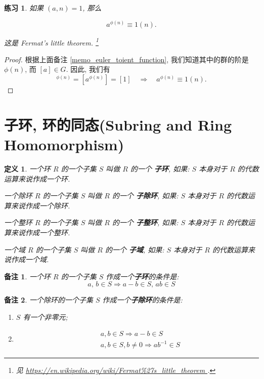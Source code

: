 \documentclass[utf8]{ctexbook}
\newtheorem{definition}{定义}[section]
\newtheorem{memo}{备注}[section]
\newtheorem{exercise}{练习}[section]
\begin{document}
\begin{exercise}
如果 $(a,n)=1$, 那么

\begin{equation}
a^{\phi(n)} \equiv 1 (n) .
\end{equation}

这是 Fermat's little theorem. \footnote{见 \url{https://en.wikipedia.org/wiki/Fermat\%27s\_little\_theorem }.}
\end{exercise}

\begin{proof}
根据上面备注 \ref{memo_euler_toient_function}, 我们知道其中的群的阶是 $\phi(n)$, 而 $[a] \in G$. 因此, 我们有
\begin{equation}
[a]^{\phi(n)} = [a ^{\phi(n)}] = [1] \quad \Rightarrow \quad a^{\phi(n)} \equiv 1(n) .
\end{equation}



\end{proof}


\section{子环, 环的同态(Subring and Ring Homomorphism)}

\begin{definition}
一个环 $R$ 的一个子集 $S$ 叫做 $R$ 的一个 \textbf{子环}, 如果: $S$ 本身对于 $R$ 的代数运算来说作成一个环.

一个除环 $R$ 的一个子集 $S$ 叫做 $R$ 的一个 \textbf{子除环}, 如果: $S$ 本身对于 $R$ 的代数运算来说作成一个除环.

一个整环 $R$ 的一个子集 $S$ 叫做 $R$ 的一个 \textbf{子整环}, 如果: $S$ 本身对于 $R$ 的代数运算来说作成一个整环.

一个域 $R$ 的一个子集 $S$ 叫做 $R$ 的一个 \textbf{子域}, 如果: $S$ 本身对于 $R$ 的代数运算来说作成一个域.
\end{definition}

\begin{memo}
一个环 $R$ 的一个子集 $S$ 作成一个\textbf{子环}的条件是:
\begin{equation}
a, \, b \in S \Longrightarrow a-b \in S, \, ab \in S
\end{equation}
\end{memo}

\begin{memo}\label{memo_division_subring}
一个除环的一个子集 $S$ 作成一个\textbf{子除环}的条件是:
\begin{enumerate}
\item{$S$ 有一个非零元;}
\item{
\begin{align*}
& a, b \in S \Longrightarrow a-b \in S \\
& a, b \in S, b \neq 0 \Longrightarrow ab^{-1} \in S 
\end{align*}
}
\end{enumerate}
\end{memo}
\end{document}
